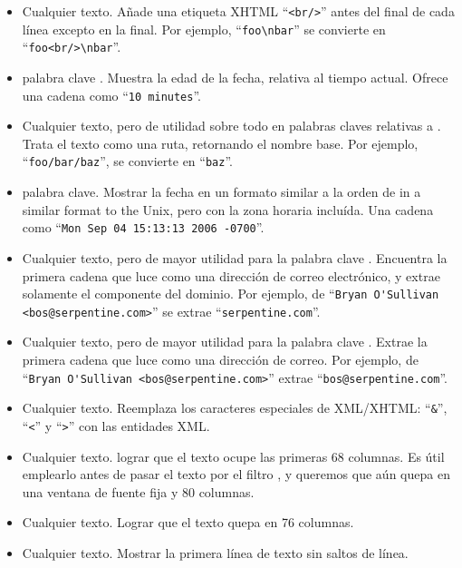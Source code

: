 {{\begin{itemize}
\item[\tplfilter{addbreaks}] Cualquier texto. Añade una etiqueta XHTML
  ``\Verb+<br/>+'' antes del final de cada línea excepto en la final.
  Por ejemplo, ``\Verb+foo\nbar+'' se convierte en ``\Verb+foo<br/>\nbar+''.
\item[\tplkwfilt{date}{age}] palabra clave .  Muestra
  la edad de la fecha, relativa al tiempo actual. Ofrece una cadena como
  ``\Verb+10 minutes+''.
\item[\tplfilter{basename}] Cualquier texto, pero de utilidad sobre
  todo en palabras claves relativas a .  Trata el
  texto como una ruta, retornando el nombre base.  Por ejemplo,
  ``\Verb+foo/bar/baz+'', se convierte en ``\Verb+baz+''.
\item[\tplkwfilt{date}{date}]  palabra clave.  Mostrar
  la fecha en un formato similar a la orden  de 
  in a similar format to the Unix, pero con la zona horaria incluída.
  Una cadena como ``\Verb+Mon Sep 04 15:13:13 2006 -0700+''.
\item[\tplkwfilt{author}{domain}] Cualquier texto, pero de mayor
  utilidad para la palabra clave .  Encuentra la
  primera cadena que luce como una dirección de correo electrónico, y
  extrae solamente el componente del dominio.  Por ejemplo, de 
  ``\Verb+Bryan O'Sullivan <bos@serpentine.com>+'' se extrae
  ``\Verb+serpentine.com+''.
\item[\tplkwfilt{author}{email}] Cualquier texto, pero de mayor
  utilidad para la palabra clave .  Extrae la primera
  cadena que luce como una dirección de correo. Por ejemplo, de
  ``\Verb+Bryan O'Sullivan <bos@serpentine.com>+'' extrae 
  ``\Verb+bos@serpentine.com+''.
\item[\tplfilter{escape}] Cualquier texto.  Reemplaza los caracteres
  especiales de XML/XHTML: ``\Verb+&+'', ``\Verb+<+'' y ``\Verb+>+''
  con las entidades XML.
\item[\tplfilter{fill68}] Cualquier texto.  lograr que el texto ocupe
  las primeras 68 columnas.  Es útil emplearlo antes de pasar el texto
  por el filtro , y queremos que aún quepa en una
  ventana de fuente fija y 80 columnas.
\item[\tplfilter{fill76}] Cualquier texto.  Lograr que el texto quepa
  en 76 columnas.
\item[\tplfilter{firstline}] Cualquier texto.  Mostrar la primera
  línea de texto sin saltos de línea.

\end{itemize}}}
